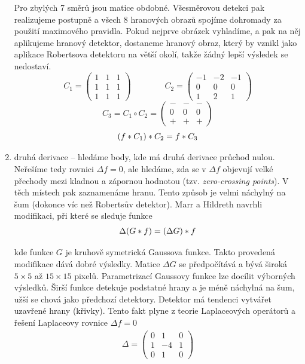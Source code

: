 \begin{enumerate}
Pro zbylých 7 směrů jsou matice obdobné. Všesměrovou detekci pak realizujeme postupně a všech 8 hranových obrazů spojíme 
dohromady za použití maximového pravidla. Pokud nejprve obrázek vyhladíme, a pak na něj aplikujeme hranový detektor,
dostaneme hranový obraz, který by vznikl jako aplikace Robertsova detektoru na větší okolí, takže žádný lepší výsledek
se nedostaví.
\begin{equation}
C_1 = \left(\begin{array}{ccc}1&1&1\\1&1&1\\1&1&1\end{array}\right) \qquad \qquad
C_2 = \left(\begin{array}{ccc}-1&-2&-1\\0&0&0\\1&2&1\end{array}\right)
\end{equation}
\begin{equation}
C_3 = C_1\circ C_2=\left(\begin{array}{ccc}-&-&-\\0&0&0\\+&+&+\end{array}\right)
\end{equation}
\begin{equation}
(f\ast C_1)\ast C_2 = f\ast C_3
\end{equation}


\item druhá derivace -- hledáme body, kde má druhá derivace průchod nulou. Neřešíme tedy rovnici $\Delta f=0$, ale hledáme,
zda se v $\Delta f$ objevují velké přechody mezi kladnou a zápornou hodnotou (tzv. \emph{zero-crossing points}). V těch 
místech pak zaznamenáme hranu. Tento způsob je velmi náchylný na šum (dokonce víc než Robertsův detektor). Marr a Hildreth
navrhli modifikaci, při které se sleduje funkce
\begin{align}
\Delta (G\ast f)=(\Delta G)\ast f
\end{align}

kde funkce $G$ je kruhově symetrická Gaussova funkce. Takto provedená modifikace dává dobré výsledky. Matice $\Delta G$ 
se předpočítává a bývá široká $5\times5$ až $15\times15$ pixelů. Parametrizací Gaussovy funkce lze docílit výborných 
výsledků. Širší funkce detekuje podstatné hrany a je méně náchylná na šum, užší se chová jako předchozí detektory.
Detektor má tendenci vytvářet uzavřené hrany (křivky). Tento fakt plyne z teorie Laplaceových operátorů a řešení
Laplaceovy rovnice $\Delta f=0$
\begin{align}
\Delta =\left(\begin{array}{ccc}0&1&0\\1&-4&1\\0&1&0\end{array}\right)
\end{align}


\end{enumerate}
